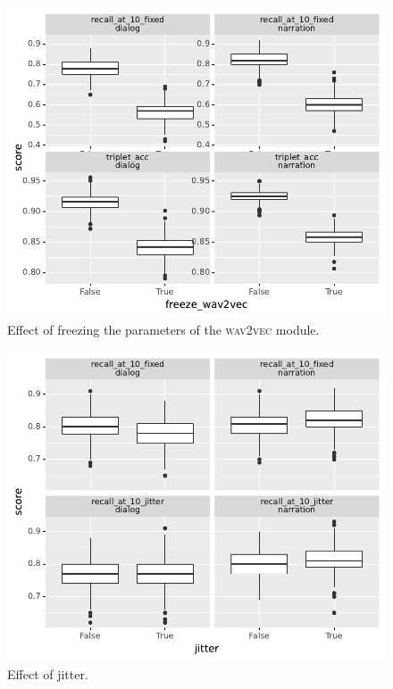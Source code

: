 \begin{figure}[htb]
  \centering
  \includegraphics[width=\columnwidth]{results/ablations/freeze_wav2vec.pdf}
  \caption{Effect of freezing the parameters of the \textsc{wav2vec} module.}
  \label{fig:freeze_wav2vec}
\end{figure}


\begin{figure}[htb]
	\centering
	\includegraphics[width=\columnwidth]{results/ablations/jitter.pdf}
	\caption{Effect of jitter.}
	\label{fig:jitter}
\end{figure}

